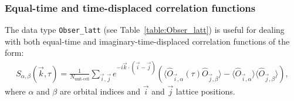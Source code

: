 \subsubsection{ Equal-time and time-displaced correlation functions}

The data type \texttt{Obser\_latt} (see Table~\ref{table:Obser_latt}) is useful for dealing with both equal-time and imaginary-time-displaced correlation functions of the form: 
\begin{align}\label{eqn:s}
	S_{\alpha,\beta}(\vec{k},\tau) =   \frac{1}{N_{\text{unit-cell}}} \sum_{\vec{i},\vec{j}}  e^{-i \vec{k} \cdot \left( \vec{i}-\vec{j}\right) } \left( \langle \hat{O}_{\vec{i},\alpha} (\tau) \hat{O}_{\vec{j},\beta} \rangle  - 
	  \langle \hat{O}_{\vec{i},\alpha} \rangle \langle   \hat{O}_{\vec{j},\beta}  \rangle \right),
\end{align}
where $\alpha$ and $\beta$ are orbital indices and $\vec{i}$ and $\vec{j}$ lattice positions.
%
